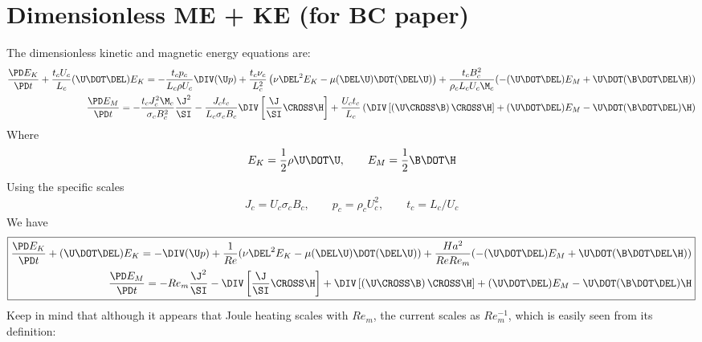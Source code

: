 \documentclass[landscape, 11pt]{article}
\begin{document}
\doublespacing
\MOONSTITLE
\maketitle

\section{Dimensionless ME + KE (for BC paper)}
The dimensionless kinetic and magnetic energy equations are:
\begin{equation}\begin{aligned}
	\frac{\PD E_K}{\PD t}
	+ \frac{t_c U_c}{L_c} (\U \DOT \DEL) E_K
	=
	- \frac{t_c p_c}{L_c \rho U_c} \DIV (\U p)
	+ \frac{t_c \nu_c}{L_c^2}
	\left( \nu \DEL^2 E_K -  \mu (\DEL \U) \DOT (\DEL \U) \right)
	+ \frac{t_c B_c^2}{\rho_c L_c U_c \M_c}
	( - (\U \DOT \DEL) E_M + \U \DOT (\B \DOT \DEL \H) ) \\
	\frac{\PD E_M}{\PD t} =
	- \frac{t_c J_c^2 \M_c}{\sigma_c B_c^2} \frac{\J^2}{\SI}
	- \frac{J_c t_c}{L_c \sigma_c B_c} \DIV \left[\frac{\J}{\SI} \CROSS \H \right]
	+ \frac{U_c t_c}{L_c}
	\left(
	\DIV \left[\left(\U \CROSS \B \right) \CROSS \H \right]
	+ (\U \DOT \DEL) E_M
	- \U \DOT (\B \DOT \DEL) \H
	\right)
\end{aligned}\end{equation}
Where
\begin{equation}
	E_K = \frac{1}{2} \rho \U \DOT \U, \qquad E_M = \frac{1}{2} \B \DOT \H
\end{equation}
Using the specific scales
\begin{equation}\begin{aligned}
	J_c = U_c \sigma_c B_c, \qquad
	p_c = \rho_c U_c^2, \qquad
	t_c = L_c / U_c
\end{aligned}\end{equation}
We have
\begin{equation}\boxed{\begin{aligned}
	\frac{\PD E_K}{\PD t}
	+ (\U \DOT \DEL) E_K
	=
	- \DIV (\U p)
	+ \frac{1}{Re} ( \nu \DEL^2 E_K -  \mu (\DEL \U) \DOT (\DEL \U) )
	+ \frac{Ha^2}{Re Re_m} (  - (\U \DOT \DEL) E_M + \U \DOT (\B \DOT \DEL \H) )
	\\
	\frac{\PD E_M}{\PD t} =
	- Re_m \frac{\J^2}{\SI}
	- \DIV \left[\frac{\J}{\SI} \CROSS \H \right]
	+
	\DIV \left[\left(\U \CROSS \B \right) \CROSS \H \right]
	+ (\U \DOT \DEL) E_M - \U \DOT (\B \DOT \DEL) \H
\end{aligned}}\end{equation}
Keep in mind that although it appears that Joule heating scales with $Re_m$, the current scales as $Re_m^{-1}$, which is easily seen from its definition:
\end{document}
